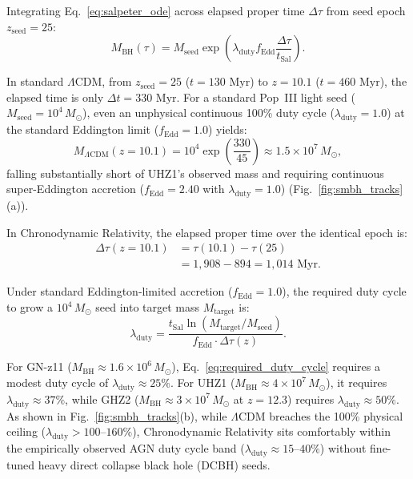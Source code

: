 \documentclass[aps,prd,reprint,superscriptaddress,nofootinbib,floatfix,amsmath,amssymb]{revtex4-2}
\begin{document}
Integrating Eq.~\eqref{eq:salpeter_ode} across elapsed proper time $\Delta\tau$ from seed epoch $z_{\text{seed}} = 25$:
\begin{equation}
M_{\text{BH}}(\tau) = M_{\text{seed}} \exp\left( \lambda_{\text{duty}} f_{\text{Edd}} \frac{\Delta\tau}{t_{\text{Sal}}} \right).
\label{eq:salpeter_solution}
\end{equation}

In standard $\Lambda\text{CDM}$, from $z_{\text{seed}} = 25$ ($t = 130\text{ Myr}$) to $z = 10.1$ ($t = 460\text{ Myr}$), the elapsed time is only $\Delta t = 330\text{ Myr}$. For a standard Pop~III light seed ($M_{\text{seed}} = 10^4\,M_\odot$), even an unphysical continuous 100\% duty cycle ($\lambda_{\text{duty}} = 1.0$) at the standard Eddington limit ($f_{\text{Edd}} = 1.0$) yields:
\begin{equation}
M_{\Lambda\text{CDM}}(z=10.1) = 10^4 \exp\left(\frac{330}{45}\right) \approx 1.5 \times 10^7\,M_\odot,
\label{eq:lcdm_smbh_growth}
\end{equation}
falling substantially short of UHZ1's observed mass and requiring continuous super-Eddington accretion ($f_{\text{Edd}} = 2.40$ with $\lambda_{\text{duty}} = 1.0$) (Fig.~\ref{fig:smbh_tracks}(a)).

In Chronodynamic Relativity, the elapsed proper time over the identical epoch is:
\begin{align}
\Delta\tau(z=10.1) &= \tau(10.1) - \tau(25) \nonumber \\
&= 1,908 - 894 = 1,014\text{ Myr}.
\label{eq:cr_smbh_proper_time}
\end{align}

Under standard Eddington-limited accretion ($f_{\text{Edd}} = 1.0$), the required duty cycle to grow a $10^4\,M_\odot$ seed into target mass $M_{\text{target}}$ is:
\begin{equation}
\lambda_{\text{duty}} = \frac{t_{\text{Sal}} \ln(M_{\text{target}} / M_{\text{seed}})}{f_{\text{Edd}} \cdot \Delta\tau(z)}.
\label{eq:required_duty_cycle}
\end{equation}

For GN-z11 ($M_{\text{BH}} \approx 1.6 \times 10^6\,M_\odot$), Eq.~\eqref{eq:required_duty_cycle} requires a modest duty cycle of $\lambda_{\text{duty}} \approx 25\%$. For UHZ1 ($M_{\text{BH}} \approx 4 \times 10^7\,M_\odot$), it requires $\lambda_{\text{duty}} \approx 37\%$, while GHZ2 ($M_{\text{BH}} \approx 3 \times 10^7\,M_\odot$ at $z = 12.3$) requires $\lambda_{\text{duty}} \approx 50\%$. As shown in Fig.~\ref{fig:smbh_tracks}(b), while $\Lambda\text{CDM}$ breaches the 100\% physical ceiling ($\lambda_{\text{duty}} > 100\text{--}160\%$), Chronodynamic Relativity sits comfortably within the empirically observed AGN duty cycle band ($\lambda_{\text{duty}} \approx 15\text{--}40\%$) without fine-tuned heavy direct collapse black hole (DCBH) seeds.
\end{document}

